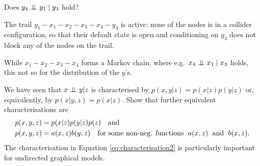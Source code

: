 \begin{exenumerate}
  \item Does $y_4 \mathrel{\perp\mspace{-10mu}\perp} y_1 \mid y_3$ hold?

    \begin{solution}
    The trail $y_1-x_1-x_2-x_3-x_4-y_4$ is active: none of the nodes
    is in a collider configuration, so that their default state is
    open and conditioning on $y_3$ does not block any of the nodes on
    the trail.

    While $x_1-x_2-x_3-x_4$ forms a Markov chain, where e.g.\ $x_4
    \mathrel{\perp\mspace{-10mu}\perp} x_1 \mid x_3$ holds, this not so for the distribution
    of the $y$'s.

    \end{solution}
\end{exenumerate}


\label{ex:independencies1}
We have seen that $x \mathrel{\perp\mspace{-10mu}\perp} y | z$ is characterised by
  $p(x,y | z) =p(x | z) p(y| z)$
  or, equivalently, by
  $p(x| y, z) = p(x | z)$.
  Show that further equivalent characterisations are
\begin{align}
  p(x,y,z) &= p(x|z) p(y|z) p(z) \quad \text{and} \label{eq:characterisation1} \\
  p(x,y,z) &= a(x,z) b(y,z) \quad \text{for some non-neg. functions \;} a(x,z) \text{\; and \;} b(x,z). \label{eq:characterisation2} 
  \end{align}
  The characterisation in Equation \eqref{eq:characterisation2} is particularly important for undirected graphical models.
